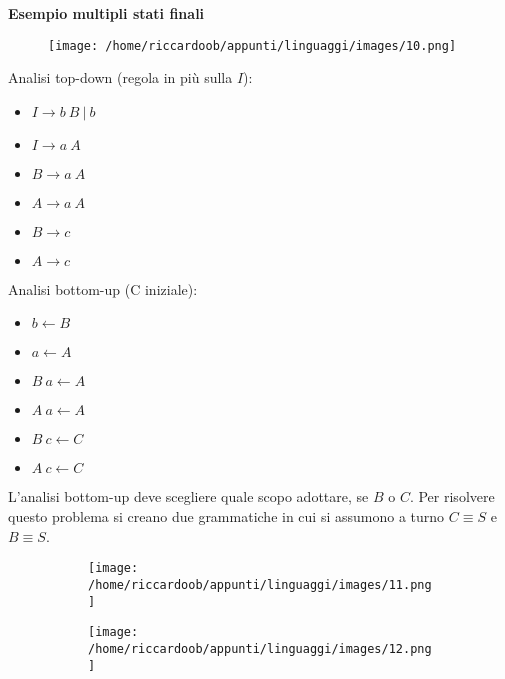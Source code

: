 \textbf{Esempio multipli stati finali}\\
\begin{figure}[H]
    \centering
    \texttt{[image: /home/riccardoob/appunti/linguaggi/images/10.png]}
\end{figure}
\newpage
{}
\begin{multicols}{2}
\noindent
Analisi top-down (regola in più sulla $I$):
\begin{itemize}
    \item $I \rightarrow b\ B\ |\ b$
    \item $I \rightarrow a\ A$
    \item $B \rightarrow a\ A$
    \item $A \rightarrow a\ A$
    \item $B \rightarrow c$
    \item $A \rightarrow c$
\end{itemize}

\columnbreak
\noindent
Analisi bottom-up (C iniziale):
\begin{itemize}
    \item $b \leftarrow  B$
    \item $a \leftarrow  A$
    \item $B\ a \leftarrow  A$
    \item $A\ a \leftarrow  A$
    \item $B\ c \leftarrow  C$
    \item $A\ c \leftarrow  C$
\end{itemize}
\end{multicols}
\setlist{}
L'analisi bottom-up deve scegliere quale scopo adottare, se $B$ o $C$. Per risolvere questo problema si creano due grammatiche in cui si assumono a turno $C \equiv S$ e $B \equiv S$.


\begin{figure}[H]
    \begin{subfigure}{0.5\textwidth}
        \centering
        \texttt{[image: /home/riccardoob/appunti/linguaggi/images/11.png]}
    \end{subfigure}%
    \begin{subfigure}{0.5\textwidth}
        \centering
        \texttt{[image: /home/riccardoob/appunti/linguaggi/images/12.png]}
    \end{subfigure}

\end{figure}

